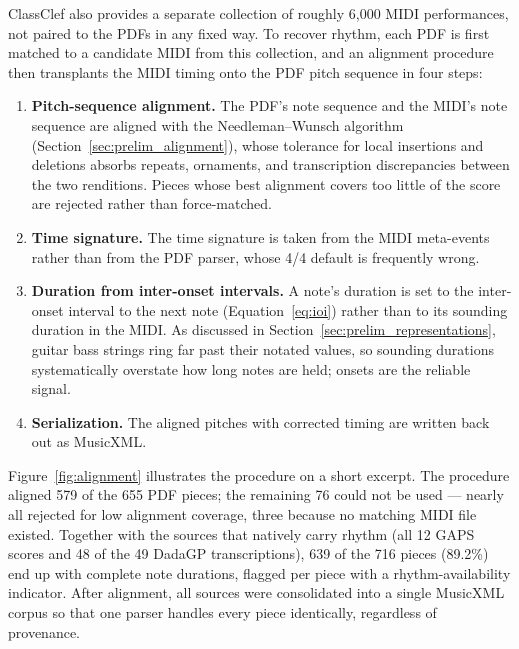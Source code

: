 ClassClef also provides a separate collection of roughly 6{,}000 MIDI performances, not paired to the PDFs in any fixed way. To recover rhythm, each PDF is first matched to a candidate MIDI from this collection, and an alignment procedure then transplants the MIDI timing onto the PDF pitch sequence in four steps:
\begin{enumerate}
    \item \textbf{Pitch-sequence alignment.} The PDF's note sequence and the MIDI's note sequence are aligned with the Needleman--Wunsch algorithm (Section~\ref{sec:prelim_alignment}), whose tolerance for local insertions and deletions absorbs repeats, ornaments, and transcription discrepancies between the two renditions. Pieces whose best alignment covers too little of the score are rejected rather than force-matched.
    \item \textbf{Time signature.} The time signature is taken from the MIDI meta-events rather than from the PDF parser, whose 4/4 default is frequently wrong.
    \item \textbf{Duration from inter-onset intervals.} A note's duration is set to the inter-onset interval to the next note (Equation~\ref{eq:ioi}) rather than to its sounding duration in the MIDI. As discussed in Section~\ref{sec:prelim_representations}, guitar bass strings ring far past their notated values, so sounding durations systematically overstate how long notes are held; onsets are the reliable signal.
    \item \textbf{Serialization.} The aligned pitches with corrected timing are written back out as MusicXML.
\end{enumerate}

Figure~\ref{fig:alignment} illustrates the procedure on a short excerpt. The procedure aligned 579 of the 655 PDF pieces; the remaining 76 could not be used --- nearly all rejected for low alignment coverage, three because no matching MIDI file existed. Together with the sources that natively carry rhythm (all 12 GAPS scores and 48 of the 49 DadaGP transcriptions), 639 of the 716 pieces (89.2\%) end up with complete note durations, flagged per piece with a rhythm-availability indicator. After alignment, all sources were consolidated into a single MusicXML corpus so that one parser handles every piece identically, regardless of provenance.

